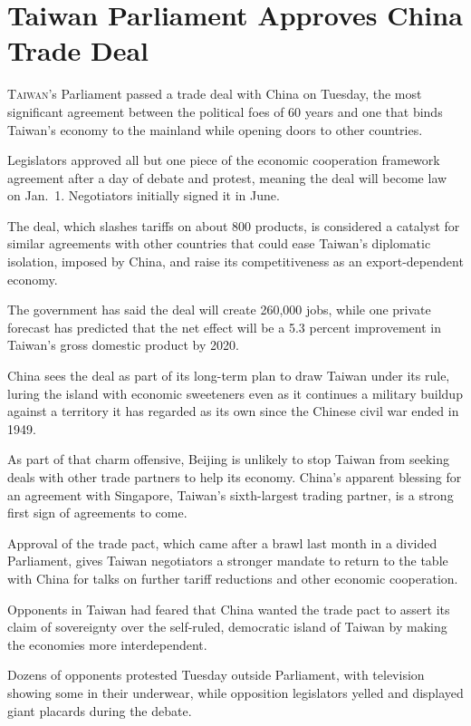 ﻿\documentclass[12pt]{article}
\begin{document}
\section{Taiwan Parliament Approves China Trade Deal}

\lettrine{T}{aiwan}'s Parliament passed a trade deal with China on Tuesday,
the most significant agreement between the political foes of 60 years and one that binds Taiwan's
economy to the mainland while opening doors to other countries.

Legislators approved all but one piece of the economic cooperation framework agreement after a day
of debate and protest, meaning the deal will become law on Jan.~1. Negotiators initially signed it
in June.

The deal, which slashes tariffs on about 800 products, is considered a catalyst for similar
agreements with other countries that could ease Taiwan's diplomatic isolation, imposed by China, and
raise its competitiveness as an export-dependent economy.

The government has said the deal will create 260,000 jobs, while one private forecast has predicted
that the net effect will be a 5.3 percent improvement in Taiwan's gross domestic product by 2020.

China sees the deal as part of its long-term plan to draw Taiwan under its rule, luring the island
with economic sweeteners even as it continues a military buildup against a territory it has regarded
as its own since the Chinese civil war ended in 1949.

As part of that charm offensive, Beijing is unlikely to stop Taiwan from seeking deals with other
trade partners to help its economy. China's apparent blessing for an agreement with Singapore,
Taiwan's sixth-largest trading partner, is a strong first sign of agreements to come.

Approval of the trade pact, which came after a brawl last month in a divided Parliament, gives
Taiwan negotiators a stronger mandate to return to the table with China for talks on further tariff
reductions and other economic cooperation.

Opponents in Taiwan had feared that China wanted the trade pact to assert its claim of sovereignty
over the self-ruled, democratic island of Taiwan by making the economies more interdependent.

Dozens of opponents protested Tuesday outside Parliament, with television showing some in their
underwear, while opposition legislators yelled and displayed giant placards during the debate.
\end{document}
